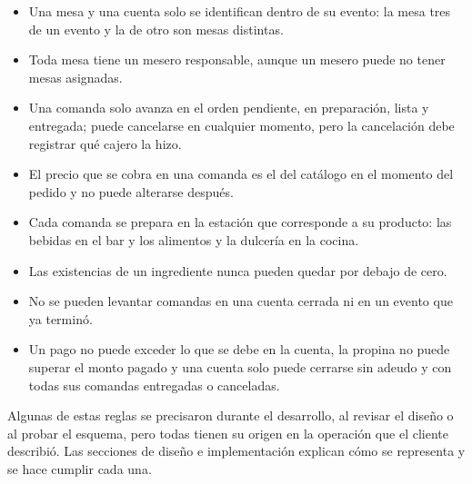 \begin{itemize}
    \item Una mesa y una cuenta solo se identifican dentro de su evento: la mesa tres de un evento y la de otro son mesas distintas.
    \item Toda mesa tiene un mesero responsable, aunque un mesero puede no tener mesas asignadas.
    \item Una comanda solo avanza en el orden pendiente, en preparación, lista y entregada; puede cancelarse en cualquier momento, pero la cancelación debe registrar qué cajero la hizo.
    \item El precio que se cobra en una comanda es el del catálogo en el momento del pedido y no puede alterarse después.
    \item Cada comanda se prepara en la estación que corresponde a su producto: las bebidas en el bar y los alimentos y la dulcería en la cocina.
    \item Las existencias de un ingrediente nunca pueden quedar por debajo de cero.
    \item No se pueden levantar comandas en una cuenta cerrada ni en un evento que ya terminó.
    \item Un pago no puede exceder lo que se debe en la cuenta, la propina no puede superar el monto pagado y una cuenta solo puede cerrarse sin adeudo y con todas sus comandas entregadas o canceladas.
\end{itemize}

Algunas de estas reglas se precisaron durante el desarrollo, al revisar el diseño o al probar el esquema, pero todas tienen su origen en la operación que el cliente describió. Las secciones de diseño e implementación explican cómo se representa y se hace cumplir cada una.
